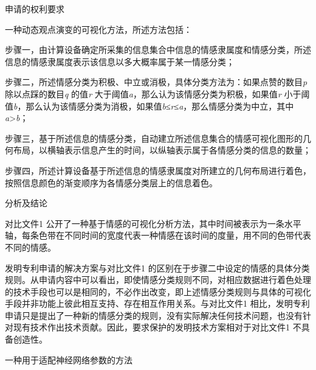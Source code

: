 {\setlength{\parindent}{20.1bp}申请的权利要求\par}

{\setlength{\parindent}{20.6bp}一种动态观点演变的可视化方法，所述方法包括：\par}

{\setlength{\parindent}{20.6bp}步骤一，由计算设备确定所采集的信息集合中信息的情感隶属度和情感分类，所述信息的情感隶属度表示该信息以多大概率属于某一情感分类；\par}

{\setlength{\parindent}{20.6bp}步骤二，所述情感分类为积极、中立或消极，具体分类方法为：如果点赞的数目\textit{p} 除以点踩的数目\textit{q} 的值\textit{r} 大于阈值\textit{a}，那么认为该情感分类为积极，如果值\textit{r} 小于阈值\textit{b}，那么认为该情感分类为消极，如果值\textit{b}≤\textit{r}≤\textit{a}，那么情感分类为中立，其中\textit{a}>\textit{b}；\par}

{\setlength{\parindent}{20.6bp}步骤三，基于所述信息的情感分类，自动建立所述信息集合的情感可视化图形的几何布局，以横轴表示信息产生的时间，以纵轴表示属于各情感分类的信息的数量；\par}

{\setlength{\parindent}{20.6bp}步骤四，所述计算设备基于所述信息的情感隶属度对所建立的几何布局进行着色，按照信息颜色的渐变顺序为各情感分类层上的信息着色。\par}

{\setlength{\parindent}{20.1bp}分析及结论\par}

{\setlength{\parindent}{20.6bp}对比文件1 公开了一种基于情感的可视化分析方法，其中时间被表示为一条水平轴，每条色带在不同时间的宽度代表一种情感在该时间的度量，用不同的色带代表不同的情感。\par}

{\setlength{\parindent}{20.6bp}发明专利申请的解决方案与对比文件1 的区别在于步骤二中设定的情感的具体分类规则。从申请内容中可以看出，即使情感分类规则不同，对相应数据进行着色处理的技术手段也可以是相同的，不必作出改变，即上述情感分类规则与具体的可视化手段并非功能上彼此相互支持、存在相互作用关系。与对比文件1 相比，发明专利申请只是提出了一种新的情感分类的规则，没有实际解决任何技术问题，也没有针对现有技术作出技术贡献。因此，要求保护的发明技术方案相对于对比文件1 不具备创造性。\par}

{\setlength{\parindent}{15.3bp}\par}

{\setlength{\parindent}{20.6bp}一种用于适配神经网络参数的方法\par}

